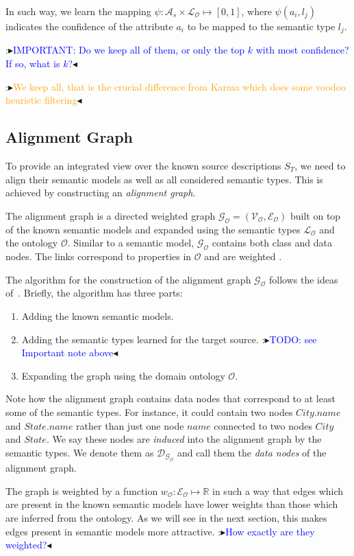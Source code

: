 \documentclass[letterpaper]{article} %
\newcommand{\authornote}[3]{
  {\fbox{\sc 
  #1}:$\blacktriangleright$\textcolor{#2}{\small{#3}}$\blacktriangleleft$}%
}
\newcommand{\ddg}[1]{\authornote{DDG}{blue}{#1}}
\newcommand{\npr}[1]{\authornote{NPR}{orange}{#1}}
\begin{document}
In such way, we learn the mapping $\psi : \mathcal{A}_s \times \mathcal{L_O} 
\mapsto [0, 1]$,
where $\psi(a_i,l_j)$ indicates the confidence of the attribute $a_i$ to be 
mapped to the semantic type $l_j$.

\ddg{IMPORTANT: Do we keep all of them, or only the top $k$ with most 
confidence? If so, 
what is $k$?}
\npr{We keep all, that is the crucial difference from Karma which does some voodoo heuristic filtering}


\subsection{Alignment Graph}

To provide an integrated view over the known source descriptions $S_T$, we 
need to align their semantic models as well as all considered semantic 
types. 
This is achieved by constructing an \emph{alignment graph}. 

The alignment graph is a directed weighted graph $\mathcal{G_O} = 
(\mathcal{V_O},\mathcal{E_O})$ built on top 
of the known semantic models and expanded using the semantic types 
$\mathcal{L_O}$ and the ontology $\mathcal{O}$. 
Similar to a semantic 
model, $\mathcal{G_O}$ contains both class and data nodes.
The links correspond 
to properties in  $\mathcal{O}$ and are weighted \cite{taheriyan2016learning}.

The algorithm for the construction of the alignment graph $\mathcal{G_O}$ follows the ideas of~\cite{taheriyan2016learning}.
Briefly, the algorithm has three parts:
\begin{enumerate}
\item Adding the known semantic models.
\item Adding the semantic types learned for the target source. \ddg{TODO: see 
Important note above}
\item Expanding the graph using the domain ontology $\mathcal{O}$.
\end{enumerate}

Note how the alignment graph contains data nodes that correspond to at least 
some of the semantic types. 
For instance, it could contain two nodes $City.name$ and $State.name$ rather than just one node $name$ connected to two 
nodes $City$ and $State$. 
We say these nodes are \emph{induced} into the 
alignment graph by the semantic types.
We denote them as $\mathcal{D_{G_O}}$ and call them the \emph{data nodes} of the alignment graph.

The graph is weighted by a function $w_\mathcal{O} : \mathcal{E_O} \mapsto 
\mathbb{R}$ in 
such a way that edges which are present in
the known semantic models have lower weights than those 
which are inferred from the ontology.
As we will see in the next section, this makes edges present in semantic models more attractive. \ddg{How exactly are 
they weighted?}
\end{document}
